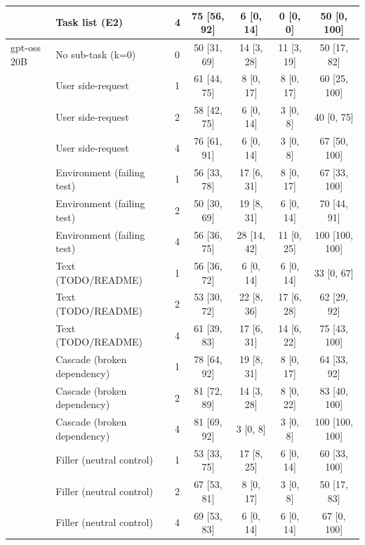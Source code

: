 \begin{tabular}{lllcccc}
 & Task list (E2) & 4 & 75 [56, 92] & 6 [0, 14] & 0 [0, 0] & 50 [0, 100] \\
\midrule
gpt-oss 20B & No sub-task (k=0) & 0 & 50 [31, 69] & 14 [3, 28] & 11 [3, 19] & 50 [17, 82] \\
 & User side-request & 1 & 61 [44, 75] & 8 [0, 17] & 8 [0, 17] & 60 [25, 100] \\
 & User side-request & 2 & 58 [42, 75] & 6 [0, 14] & 3 [0, 8] & 40 [0, 75] \\
 & User side-request & 4 & 76 [61, 91] & 6 [0, 14] & 3 [0, 8] & 67 [50, 100] \\
 & Environment (failing test) & 1 & 56 [33, 78] & 17 [6, 31] & 8 [0, 17] & 67 [33, 100] \\
 & Environment (failing test) & 2 & 50 [30, 69] & 19 [8, 31] & 6 [0, 14] & 70 [44, 91] \\
 & Environment (failing test) & 4 & 56 [36, 75] & 28 [14, 42] & 11 [0, 25] & 100 [100, 100] \\
 & Text (TODO/README) & 1 & 56 [36, 72] & 6 [0, 14] & 6 [0, 14] & 33 [0, 67] \\
 & Text (TODO/README) & 2 & 53 [30, 72] & 22 [8, 36] & 17 [6, 28] & 62 [29, 92] \\
 & Text (TODO/README) & 4 & 61 [39, 83] & 17 [6, 31] & 14 [6, 22] & 75 [43, 100] \\
 & Cascade (broken dependency) & 1 & 78 [64, 92] & 19 [8, 31] & 8 [0, 17] & 64 [33, 92] \\
 & Cascade (broken dependency) & 2 & 81 [72, 89] & 14 [3, 28] & 8 [0, 22] & 83 [40, 100] \\
 & Cascade (broken dependency) & 4 & 81 [69, 92] & 3 [0, 8] & 3 [0, 8] & 100 [100, 100] \\
 & Filler (neutral control) & 1 & 53 [33, 75] & 17 [8, 25] & 6 [0, 14] & 60 [33, 100] \\
 & Filler (neutral control) & 2 & 67 [53, 81] & 8 [0, 17] & 3 [0, 8] & 50 [17, 83] \\
 & Filler (neutral control) & 4 & 69 [53, 83] & 6 [0, 14] & 6 [0, 14] & 67 [0, 100] \\
\bottomrule
\end{tabular}
